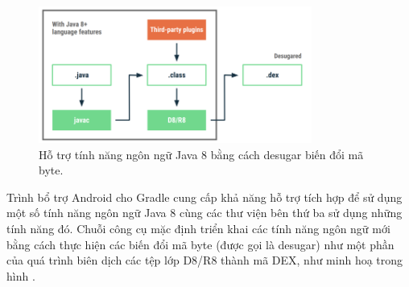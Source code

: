         \begin{figure}[H]
            \centering
            \includegraphics[width=0.8\textwidth]{images/javainandroid.png}
            \caption{Hỗ trợ tính năng ngôn ngữ Java 8 bằng cách desugar biến đổi mã byte.}
            \label{fig:android2}
        \end{figure}
        
        Trình bổ trợ Android cho Gradle cung cấp khả năng hỗ trợ tích hợp để sử dụng một số tính năng ngôn ngữ Java 8 cùng các thư viện bên thứ ba sử dụng những tính năng đó. Chuỗi công cụ mặc định triển khai các tính năng ngôn ngữ mới bằng cách thực hiện các biến đổi mã byte (được gọi là desugar) như một phần của quá trình biên dịch các tệp lớp D8/R8 thành mã DEX, như minh hoạ trong hình \cite{java8}.

